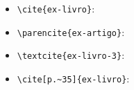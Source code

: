 \documentclass[a4paper]{article}
\begin{document}
\begin{itemize}
  \item \verb|\cite{ex-livro}|: \cite{ex-livro}
  \item \verb|\parencite{ex-artigo}|: \parencite{ex-artigo}
  \item \verb|\textcite{ex-livro-3}|: \textcite{ex-livro-3}
  \item \verb|\cite[p.~35]{ex-livro}|: \cite[p.~35]{ex-livro}
\end{itemize}

\printbibliography
\end{document}
